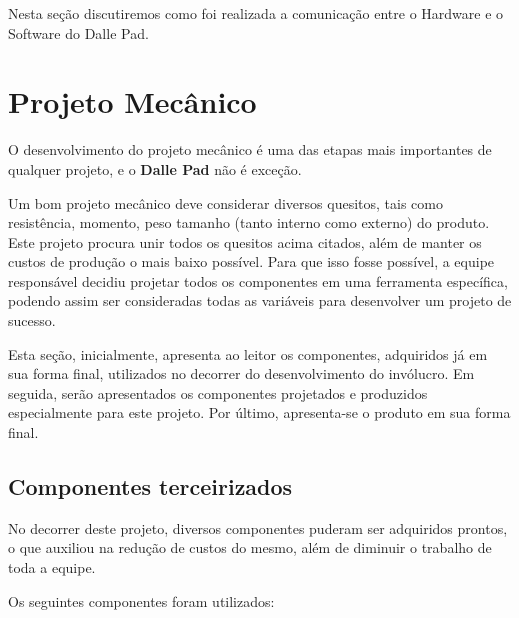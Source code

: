         Nesta seção discutiremos como foi realizada a comunicação entre o Hardware e o Software do Dalle Pad.

    \section{Projeto Mecânico}

        O desenvolvimento do projeto mecânico é uma das etapas mais importantes de qualquer projeto, e o \textbf{Dalle Pad} não é exceção.
        
        Um bom projeto mecânico deve considerar diversos quesitos, tais como resistência, momento, peso tamanho (tanto interno como externo) do produto. Este projeto procura unir todos os quesitos acima citados, além de manter os custos de produção o mais baixo possível. Para que isso fosse possível, a equipe responsável decidiu projetar todos os componentes em uma ferramenta específica, podendo assim ser consideradas todas as variáveis para desenvolver um projeto de sucesso.
        
        Esta seção, inicialmente, apresenta ao leitor os componentes, adquiridos já em sua forma final, utilizados no decorrer do desenvolvimento do invólucro. Em seguida, serão apresentados os componentes projetados e produzidos especialmente para este projeto. Por último, apresenta-se o produto em sua forma final.
        
        \subsection{Componentes terceirizados}
        
            No decorrer deste projeto, diversos componentes puderam ser adquiridos prontos, o que auxiliou na redução de custos do mesmo, além de diminuir o trabalho de toda a equipe.

            Os seguintes componentes foram utilizados:

